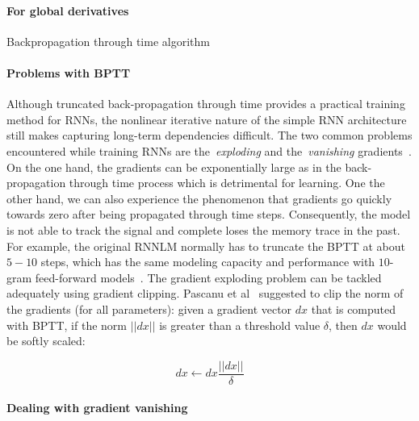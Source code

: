 \paragraph{For global derivatives}

Backpropagation through time algorithm 

\paragraph{Problems with BPTT}

Although truncated back-propagation through time provides a practical training method for RNNs, the nonlinear iterative nature of the simple RNN architecture still makes capturing long-term dependencies difficult. The two common problems encountered while training RNNs are the~\textit{exploding} and the~\textit{vanishing} gradients~\cite{bengio1994learning,pascanu2013difficulty}. On the one hand, the gradients can be exponentially large as in the back-propagation through time process which is detrimental for learning. One the other hand, we can also experience the phenomenon that gradients go quickly towards zero after being propagated through time steps. Consequently, the model is not able to track the signal and complete loses the memory trace in the past. For example, the original RNNLM normally has to truncate the BPTT at about $5-10$ steps, which has the same modeling capacity and performance with $10$-gram feed-forward models~\cite{mikolov2011extensions,hai2012measuring}. The gradient exploding problem can be tackled adequately using gradient clipping. Pascanu et al~\cite{pascanu2013difficulty} suggested to clip the norm of the gradients (for all parameters): given a gradient vector $dx$ that is computed with BPTT, if the norm $||dx||$ is greater than a threshold value $\delta$, then $dx$ would be softly scaled:

\begin{equation}
dx \leftarrow dx\frac{||dx||}{\delta}
\end{equation}

\paragraph{Dealing with gradient vanishing}

